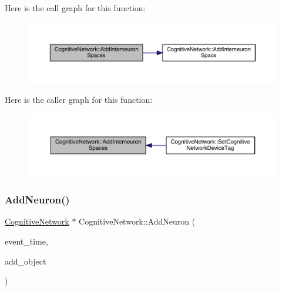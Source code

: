 Here is the call graph for this function\+:
\nopagebreak
\begin{figure}[H]
\begin{center}
\leavevmode
\includegraphics[width=350pt]{class_cognitive_network_aeafe16b9f44ae1316c072a85e726ee83_cgraph}
\end{center}
\end{figure}
Here is the caller graph for this function\+:
\nopagebreak
\begin{figure}[H]
\begin{center}
\leavevmode
\includegraphics[width=350pt]{class_cognitive_network_aeafe16b9f44ae1316c072a85e726ee83_icgraph}
\end{center}
\end{figure}
\mbox{\label{class_cognitive_network_a8457342637fde2d814c54942c3367416}} 
\subsubsection{\texorpdfstring{Add\+Neuron()}{AddNeuron()}}
{\footnotesize\ttfamily \hyperlink{class_cognitive_network}{Cognitive\+Network} $\ast$ Cognitive\+Network\+::\+Add\+Neuron (\begin{DoxyParamCaption}\item[{std\+::chrono\+::time\+\_\+point$<$ \hyperlink{universe_8h_a0ef8d951d1ca5ab3cfaf7ab4c7a6fd80}{Clock} $>$}]{event\+\_\+time,  }\item[{\hyperlink{class_cognitive_network}{Cognitive\+Network} $\ast$}]{add\+\_\+object }\end{DoxyParamCaption})}



